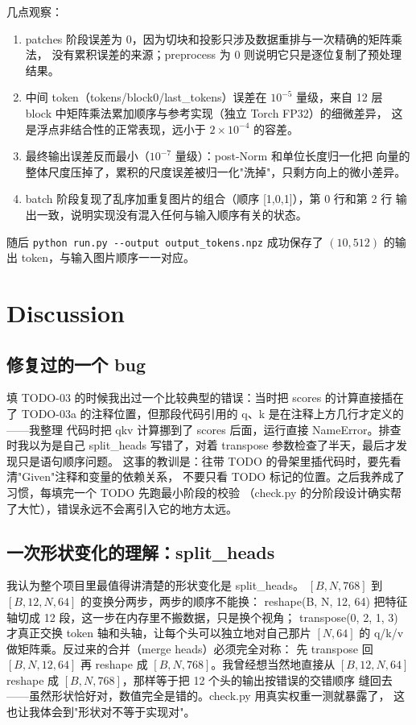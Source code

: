 \documentclass[a4paper,12pt]{article}
\begin{document}
几点观察：

\begin{enumerate}
    \item patches 阶段误差为 0，因为切块和投影只涉及数据重排与一次精确的矩阵乘法，
    没有累积误差的来源；preprocess 为 0 则说明它只是逐位复制了预处理结果。
    \item 中间 token（tokens/block0/last\_tokens）误差在 $10^{-5}$ 量级，来自
    12 层 block 中矩阵乘法累加顺序与参考实现（独立 Torch FP32）的细微差异，
    这是浮点非结合性的正常表现，远小于 $2\times10^{-4}$ 的容差。
    \item 最终输出误差反而最小（$10^{-7}$ 量级）：post-Norm 和单位长度归一化把
    向量的整体尺度压掉了，累积的尺度误差被归一化"洗掉"，只剩方向上的微小差异。
    \item batch 阶段复现了乱序加重复图片的组合（顺序 [1,0,1]），第 0 行和第 2 行
    输出一致，说明实现没有混入任何与输入顺序有关的状态。
\end{enumerate}

随后 \verb|python run.py --output output_tokens.npz| 成功保存了
$(10, 512)$ 的输出 token，与输入图片顺序一一对应。

\section{Discussion}

\subsection{修复过的一个 bug}

填 TODO-03 的时候我出过一个比较典型的错误：当时把 scores 的计算直接插在了
TODO-03a 的注释位置，但那段代码引用的 q、k 是在注释上方几行才定义的——我整理
代码时把 qkv 计算挪到了 scores 后面，运行直接 NameError。排查时我以为是自己
split\_heads 写错了，对着 transpose 参数检查了半天，最后才发现只是语句顺序问题。
这事的教训是：往带 TODO 的骨架里插代码时，要先看清"Given"注释和变量的依赖关系，
不要只看 TODO 标记的位置。之后我养成了习惯，每填完一个 TODO 先跑最小阶段的校验
（check.py 的分阶段设计确实帮了大忙），错误永远不会离引入它的地方太远。

\subsection{一次形状变化的理解：split\_heads}

我认为整个项目里最值得讲清楚的形状变化是 split\_heads。
$[B,N,768]$ 到 $[B,12,N,64]$ 的变换分两步，两步的顺序不能换：
reshape(B, N, 12, 64) 把特征轴切成 12 段，这一步在内存里不搬数据，只是换个视角；
transpose(0, 2, 1, 3) 才真正交换 token 轴和头轴，让每个头可以独立地对自己那片
$[N,64]$ 的 q/k/v 做矩阵乘。反过来的合并（merge heads）必须完全对称：
先 transpose 回 $[B,N,12,64]$ 再 reshape 成 $[B,N,768]$。我曾经想当然地直接从
$[B,12,N,64]$ reshape 成 $[B,N,768]$，那样等于把 12 个头的输出按错误的交错顺序
缝回去——虽然形状恰好对，数值完全是错的。check.py 用真实权重一测就暴露了，
这也让我体会到"形状对不等于实现对"。
\end{document}
